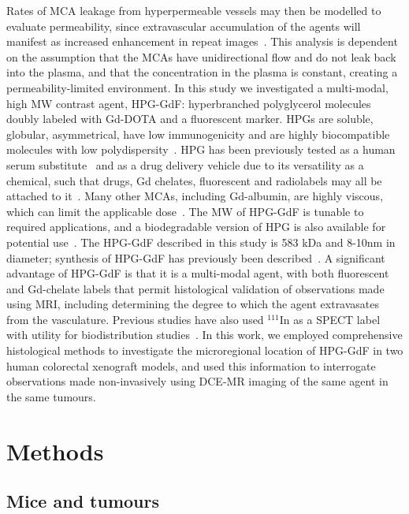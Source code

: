 Rates of \acs{MCA} leakage from hyperpermeable vessels may then be modelled to evaluate permeability, since extravascular accumulation of the agents will manifest as increased enhancement in repeat images~\cite{Ogan:1987tg,Turetschek:2004bw}.
This analysis is dependent on the assumption that the \acs{MCA}s have unidirectional flow and do not leak back into the plasma, and that the concentration in the plasma is constant, creating a permeability-limited environment.
In this study we investigated a multi-modal, high \acs{MW} contrast agent, \acs{HPG-GdF}: hyperbranched polyglycerol molecules doubly labeled with Gd-DOTA and a fluorescent marker.
HPGs are soluble, globular, asymmetrical, have low immunogenicity and are highly biocompatible molecules with low polydispersity~\cite{Saatchi:2012hc,Kainthan:2006ce,Saatchi:2012gc}.
HPG has been previously tested as a human serum substitute~\cite{Kainthan:2008ek} and as a drug delivery vehicle due to its versatility as a chemical, such that drugs, Gd chelates, fluorescent and radiolabels may all be attached to it~\cite{Shenoi:2013id}.
Many other \acs{MCA}s, including Gd-albumin, are highly viscous, which can limit the applicable dose~\cite{Imranulhaq:2012ij}.
The \acs{MW} of \acs{HPG-GdF} is tunable to required applications, and a biodegradable version of HPG is also available for potential use~\cite{Shenoi:2013id}.
The \acs{HPG-GdF} described in this study is 583 \acs{kDa} and 8-10nm in diameter; synthesis of \acs{HPG-GdF} has previously been described~\cite{Saatchi:2012hc}.
A significant advantage of \acs{HPG-GdF} is that it is a multi-modal agent, with both fluorescent and Gd-chelate labels that permit histological validation of observations made using MRI, including determining the degree to which the agent extravasates from the vasculature.
Previous studies have also used $^{111}$In as a SPECT label with utility for biodistribution studies~\cite{Saatchi:2012hc}.
In this work, we employed comprehensive histological methods to investigate the microregional location of \acs{HPG-GdF} in two human colorectal xenograft models, and used this information to interrogate observations made non-invasively using DCE-MR imaging of the same agent in the same tumours.

\section{Methods}
\label{hpgpaper1_methods}
\subsection{Mice and tumours}

